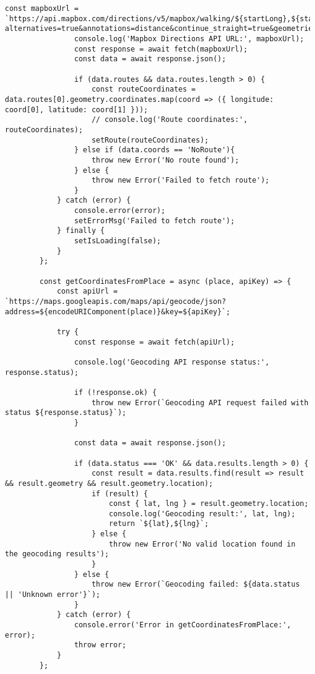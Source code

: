 \begin{lstlisting}[caption={Code-voorbeeld van het navigatiescherm}, label=code-voorbeeld navigatiescherm, captionpos=b]
                const mapboxUrl = `https://api.mapbox.com/directions/v5/mapbox/walking/${startLong},${startLat};${endLong},${endLat}?alternatives=true&annotations=distance&continue_straight=true&geometries=geojson&overview=full&steps=false&access_token=MAPBOX_PUBLIC_TOKEN`
                console.log('Mapbox Directions API URL:', mapboxUrl);
                const response = await fetch(mapboxUrl);
                const data = await response.json();
                                
                if (data.routes && data.routes.length > 0) {
                    const routeCoordinates = data.routes[0].geometry.coordinates.map(coord => ({ longitude: coord[0], latitude: coord[1] }));
                    // console.log('Route coordinates:', routeCoordinates);
                    setRoute(routeCoordinates);
                } else if (data.coords == 'NoRoute'){
                    throw new Error('No route found');
                } else {
                    throw new Error('Failed to fetch route');
                }
            } catch (error) {
                console.error(error);
                setErrorMsg('Failed to fetch route');
            } finally {
                setIsLoading(false);
            }
        };
        
        const getCoordinatesFromPlace = async (place, apiKey) => {
            const apiUrl = `https://maps.googleapis.com/maps/api/geocode/json?address=${encodeURIComponent(place)}&key=${apiKey}`;
            
            try {
                const response = await fetch(apiUrl);
                
                console.log('Geocoding API response status:', response.status);
                
                if (!response.ok) {
                    throw new Error(`Geocoding API request failed with status ${response.status}`);
                }
                
                const data = await response.json();
                                
                if (data.status === 'OK' && data.results.length > 0) {
                    const result = data.results.find(result => result && result.geometry && result.geometry.location);
                    if (result) {
                        const { lat, lng } = result.geometry.location;
                        console.log('Geocoding result:', lat, lng);
                        return `${lat},${lng}`;
                    } else {
                        throw new Error('No valid location found in the geocoding results');
                    }
                } else {
                    throw new Error(`Geocoding failed: ${data.status || 'Unknown error'}`);
                }
            } catch (error) {
                console.error('Error in getCoordinatesFromPlace:', error);
                throw error;
            }
        };
        

\end{lstlisting}
